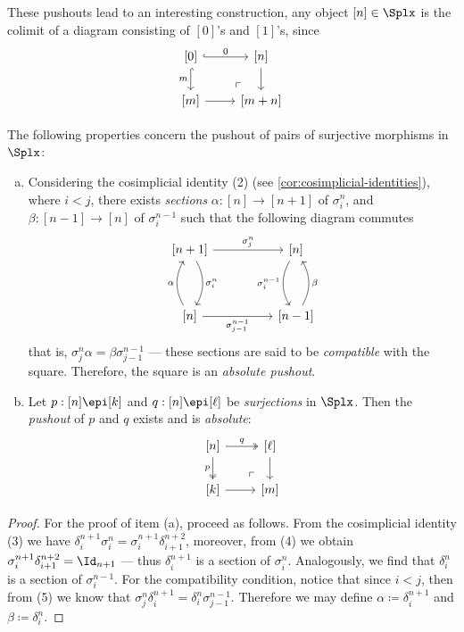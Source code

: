 These pushouts lead to an interesting construction, any object \([n] \in \Splx\)
is the colimit of a diagram consisting of \([0]\)'s and \([1]\)'s, since
\[
\begin{tikzcd}
{[0]} \ar[r, hook, "0"]
\ar[d, hook, "m"'] \ar[rd, phantom, very near end, "\ulcorner"]
&{[n]} \ar[d] \\
{[m]} \ar[r] &{[m + n]}
\end{tikzcd}
\]

\begin{lemma}
\label{lem:splx-cat-pushout-surjections}
The following properties concern the pushout of pairs of surjective morphisms in
\(\Splx\):
\begin{enumerate}[(a)]\setlength\itemsep{0em}
\item Considering the cosimplicial identity (2) (see
  \cref{cor:cosimplicial-identities}), where \(i < j\), there exists
  \emph{sections} \(\alpha: [n] \to [n+1]\) of \(\sigma_i^n\), and
  \(\beta: [n-1] \to [n]\) of \(\sigma_i^{n-1}\) such that the following diagram
  commutes
  \[
  \begin{tikzcd}
  {[n+1]} \ar[rr, "\sigma_j^n"] \ar[dd, bend left, "\sigma_i^n"]
  &&{[n]} \ar[dd, bend right, "\sigma_i^{n-1}"'] \\ & &\\
  {[n]} \ar[uu, bend left, "\alpha"] \ar[rr, "\sigma_{j-1}^{n-1}"']
  &&{[n-1]} \ar[uu, bend right, "\beta"']
  \end{tikzcd}
  \]
  that is, \(\sigma_j^n \alpha = \beta \sigma_{j-1}^{n-1}\) --- these sections
  are said to be \emph{compatible} with the square. Therefore, the square is an
  \emph{absolute pushout}.
\item Let \(p: [n] \epi [k]\) and \(q: [n] \epi [\ell]\) be \emph{surjections}
  in \(\Splx\). Then the \emph{pushout} of \(p\) and \(q\) exists and is
  \emph{absolute}:
  \[
  \begin{tikzcd}
  {[n]} \ar[r, two heads, "q"]
  \ar[d, two heads, "p"']
  \ar[rd, very near end, phantom, "\ulcorner"]
  &{[\ell]} \ar[d] \\
  {[k]} \ar[r] &{[m]}
  \end{tikzcd}
  \]
\end{enumerate}
\end{lemma}

\begin{proof}
For the proof of item (a), proceed as follows. From the cosimplicial identity
(3) we have \(\delta_i^{n+1} \sigma_i^n = \sigma_i^{n+1} \delta_{i+1}^{n+2}\),
moreover, from (4) we obtain \(\sigma_i^{n+1} \delta_{i+1}^{n+2} = \Id_{n+1}\)
--- thus \(\delta_i^{n+1}\) is a section of \(\sigma_i^n\). Analogously, we find
that \(\delta_i^n\) is a section of \(\sigma_i^{n-1}\). For the
compatibility condition, notice that since \(i < j\), then from (5) we know that
\(\sigma_j^n \delta_i^{n+1} = \delta_i^n \sigma_{j-1}^{n-1}\). Therefore we may
define \(\alpha \coloneq \delta_i^{n+1}\) and \(\beta \coloneq \delta_i^n\).

\end{proof}

